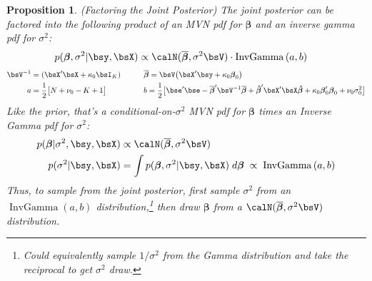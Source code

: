 \documentclass[12pt]{article}
\theoremstyle{plain}
\newtheorem{prop}[thm]{Proposition}
\theoremstyle{definition}
\theoremstyle{remark}
\newcommand{\bsbeta}{\boldsymbol{\beta}}
\newcommand{\bshatbeta}{\boldsymbol{\hat{\beta}}}
\newcommand{\bsbarbeta}{\boldsymbol{\overline{\beta}}}
\begin{document}
\begin{prop}
\label{prop:posteriornormal}
\emph{(Factoring the Joint Posterior)}
The joint posterior can be factored into the following product of an MVN
pdf for $\bsbeta$ and an inverse gamma pdf for $\sigma^2$:
\begin{align}
  p(\bsbeta, \sigma^2 | \bsy,\bsX)
  &\propto
  \calN(\bsbarbeta,\sigma^2\bsV)
  \cdot
  \operatorname{InvGamma}\left(a,b\right)
  \label{posteriornormal}
\end{align}
\begin{alignat}{3}
  \bsV^{-1}&=(\bsX'\bsX+\kappa_0\bsI_K)
  \qquad
  &&\bsbarbeta
  = \bsV\big(\bsX'\bsy + \kappa_0\bsbeta_0\big) \notag\\
  a&=\frac{1}{2} \big[N+\nu_0-K+1\big]
  \qquad
  &&b=
  \frac{1}{2}
  \big[
    \bse'\bse
    - \bsbarbeta'\bsV^{-1}\bsbarbeta
    + \bshatbeta'\bsX'\bsX\bshatbeta
    + \kappa_0\bsbeta_0'\bsbeta_0
    +\nu_0\sigma^2_0
  \big]
  \notag
\end{alignat}
Like the prior, that's a conditional-on-$\sigma^2$ MVN pdf for $\bsbeta$
times an Inverse Gamma pdf for $\sigma^2$:
\begin{align}
  p(\bsbeta | \sigma^2, \bsy, \bsX)
  &\propto
  \calN(\bsbarbeta,\sigma^2\bsV)
  \notag
  \\
  p(\sigma^2|\bsy,\bsX)
  &=\int p(\bsbeta, \sigma^2 | \bsy,\bsX) \; d\bsbeta
  \;\propto\;
  \operatorname{InvGamma}\left(a,b\right)
  \label{sigpos}
\end{align}
Thus, to sample from the joint posterior, first sample $\sigma^2$ from
an $\operatorname{InvGamma}(a,b)$ distribution,\footnote{%
  Could equivalently sample $1/\sigma^2$ from the Gamma distribution
  and take the reciprocal to get $\sigma^2$ draw.
}
then draw $\bsbeta$ from a $\calN(\bsbarbeta,\sigma^2\bsV)$
distribution.
\end{prop}
\end{document}
